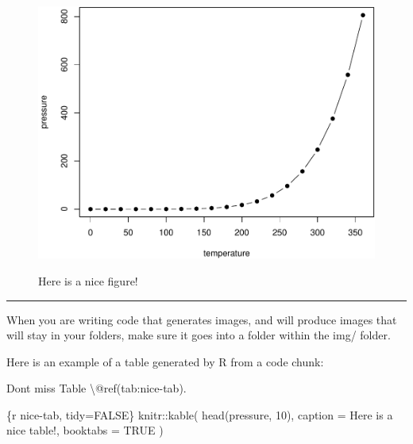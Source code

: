\documentclass[
]{book}
\newenvironment{Shaded}{\begin{snugshade}}{\end{snugshade}}
\newcommand{\NormalTok}[1]{#1}
\newenvironment{redbox}{
  \definecolor{shadecolor}{RGB}{243, 154, 157}
  \color{white}
  \begin{shaded}}
 {\end{shaded}}
\theoremstyle{definition}
\theoremstyle{definition}
\theoremstyle{definition}
\theoremstyle{definition}
\theoremstyle{remark}
\begin{document}
\begin{figure}

{\centering \includegraphics[width=0.8\linewidth,alt={Plot with connected points showing that vapor pressure of mercury increases exponentially as temperature increases.}]{_main_files/figure-latex/nice-fig-1} 

}

\caption{Here is a nice figure!}\label{fig:nice-fig}
\end{figure}

\begin{center}\rule{0.5\linewidth}{0.5pt}\end{center}

\begin{redbox}

\begin{center}
When you are writing code that generates images, and will produce images that will stay in your folders, make sure it goes into a folder within the img/ folder.

\end{center}

\end{redbox}

Here is an example of a table generated by R from a code chunk:

\begin{Shaded}
\begin{Highlighting}[]
\NormalTok{Don\textquotesingle{}t miss Table \textbackslash{}@ref(tab:nice{-}tab).}

\NormalTok{\textasciigrave{}\textasciigrave{}\textasciigrave{}\{r nice{-}tab, tidy=FALSE\}}
\NormalTok{knitr::kable(}
\NormalTok{  head(pressure, 10), caption = \textquotesingle{}Here is a nice table!\textquotesingle{},}
\NormalTok{  booktabs = TRUE}
\NormalTok{)}
\NormalTok{\textasciigrave{}\textasciigrave{}\textasciigrave{}}
\end{Highlighting}
\end{Shaded}
\end{document}
